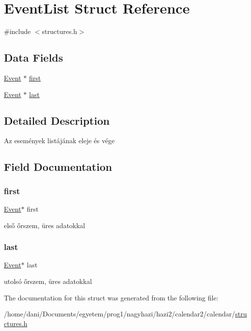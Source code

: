 \hypertarget{struct_event_list}{}\section{Event\+List Struct Reference}
\label{struct_event_list}


{\ttfamily \#include $<$structures.\+h$>$}

\subsection*{Data Fields}
\begin{DoxyCompactItemize}
\item 
\hyperlink{struct_event}{Event} $\ast$ \hyperlink{struct_event_list_ab866d72c6e161e5eb85d4940b0dbc62e}{first}
\item 
\hyperlink{struct_event}{Event} $\ast$ \hyperlink{struct_event_list_a8e52f53a3606d45d86182ce606e9369d}{last}
\end{DoxyCompactItemize}


\subsection{Detailed Description}
Az események listájának eleje és vége 

\subsection{Field Documentation}
\mbox{\label{struct_event_list_ab866d72c6e161e5eb85d4940b0dbc62e}} 
\subsubsection{\texorpdfstring{first}{first}}
{\footnotesize\ttfamily \hyperlink{struct_event}{Event}$\ast$ first}

első őrszem, üres adatokkal \mbox{\label{struct_event_list_a8e52f53a3606d45d86182ce606e9369d}} 
\subsubsection{\texorpdfstring{last}{last}}
{\footnotesize\ttfamily \hyperlink{struct_event}{Event}$\ast$ last}

utolsó őrszem, üres adatokkal 

The documentation for this struct was generated from the following file\+:\begin{DoxyCompactItemize}
\item 
/home/dani/\+Documents/egyetem/prog1/nagyhazi/hazi2/calendar2/calendar/\hyperlink{structures_8h}{structures.\+h}\end{DoxyCompactItemize}
